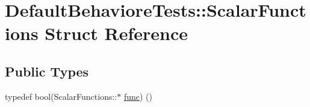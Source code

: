 \hypertarget{structDefaultBehavioreTests_1_1ScalarFunctions}{}\section{Default\+Behaviore\+Tests\+::Scalar\+Functions Struct Reference}
\label{structDefaultBehavioreTests_1_1ScalarFunctions}
\subsection*{Public Types}
\begin{DoxyCompactItemize}
\item 
typedef bool(Scalar\+Functions\+::$\ast$ \mbox{\hyperlink{structDefaultBehavioreTests_1_1ScalarFunctions_ada3040daa5305ca2e73cba998068027e}{func}}) ()
\end{DoxyCompactItemize}
